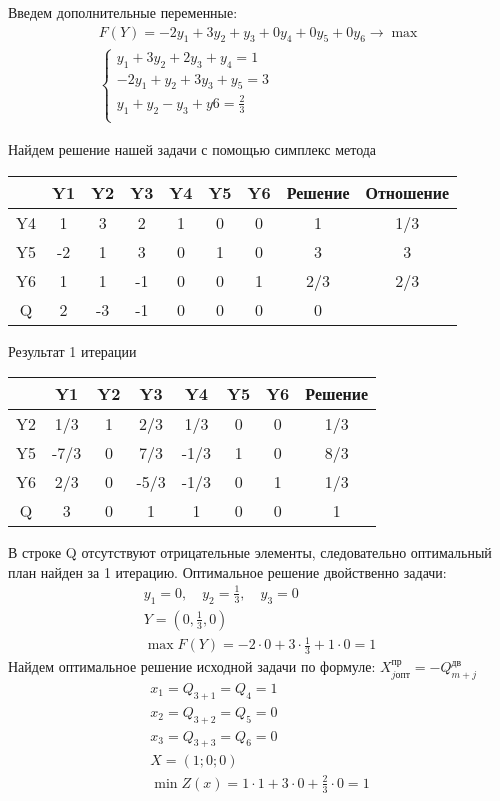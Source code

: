 \documentclass[a4paper, 12pt]{article}
\begin{document}
Введем дополнительные переменные:
\begin{align*}
  F(Y)=-2y_1+3y_2+y_3+0y_4+0y_5+0y_6 \rightarrow \max\\
  \begin{cases}
    y_1+3y_2+2y_3+y_4 = 1\\
    -2y_1+y_2+3y_3+y_5 = 3\\
    y_1+y_2-y_3+y6 = \frac{2}{3}\\
  \end{cases} 
\end{align*}

Найдем решение нашей задачи с помощью симплекс метода
\begin{table}[H]
\centering
\begin{tabular}{|c|c|c|c|c|c|c|c|c|}
\hline
   & Y1 & \cellcolor[HTML]{FFCCC9}Y2 & Y3 & Y4 & Y5 & Y6 & Решение & Отношение \\ \hline
\rowcolor[HTML]{FFFC9E} 
Y4 & 1  & 3                          & 2  & 1  & 0  & 0  & 1       & 1/3       \\ \hline
Y5 & -2 & \cellcolor[HTML]{FFCCC9}1  & 3  & 0  & 1  & 0  & 3       & 3         \\ \hline
Y6 & 1  & \cellcolor[HTML]{FFCCC9}1  & -1 & 0  & 0  & 1  & 2/3     & 2/3       \\ \hline
Q  & 2 & \cellcolor[HTML]{FFCCC9}-3  & -1  & 0  & 0  & 0  & 0       &           \\ \hline
\end{tabular}
\end{table}

Результат 1 итерации
\begin{table}[H]
\centering
\begin{tabular}{|c|c|c|c|c|c|c|c|}
\hline
   & Y1   & Y2 & Y3   & Y4   & Y5 & Y6 & Решение \\ \hline
Y2 & 1/3  & 1  & 2/3  & 1/3  & 0  & 0  & 1/3     \\ \hline
Y5 & -7/3 & 0  & 7/3  & -1/3 & 1  & 0  & 8/3     \\ \hline
Y6 & 2/3  & 0  & -5/3 & -1/3 & 0  & 1  & 1/3     \\ \hline
Q  & 3    & 0  & 1    & 1    & 0  & 0  & 1       \\ \hline
\end{tabular}
\end{table}

В строке Q отсутствуют отрицательные элементы, следовательно оптимальный план найден за 1 итерацию. Оптимальное решение двойственно задачи: 
\begin{align*}
  y_1=0,\quad y_2=\frac{1}{3},\quad y_3=0\\
  Y=(0,\frac{1}{3},0)\\
  \max F(Y) = -2\cdot0+3\cdot\frac{1}{3}+1\cdot0 = 1
\end{align*}
Найдем оптимальное решение исходной задачи по формуле: $X_{j\text{опт}}^{\text{пр}} = -Q_{m+j}^{\text{дв}}$
\begin{align}
  x_1=Q_{3+1}=Q_4=1\\
  x_2=Q_{3+2}=Q_5=0\\
  x_3=Q_{3+3}=Q_6=0\\
  X=(1;0;0)\\
  \min Z(x)=1\cdot 1+3\cdot0+\frac{2}{3}\cdot0 = 1
\end{align}
\end{document}

